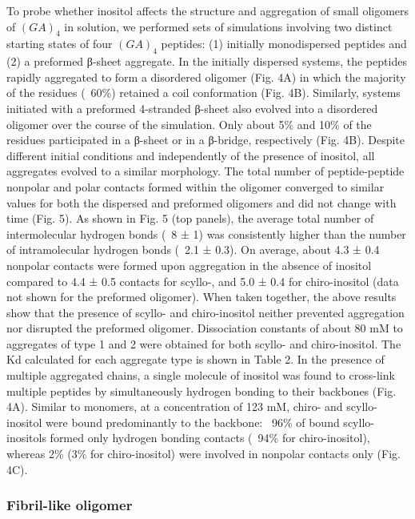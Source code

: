 	To probe whether inositol affects the structure and aggregation of small oligomers of $(GA)_4$ in solution, we performed sets of simulations involving two distinct starting states of four $(GA)_4$ peptides: (1) initially monodispersed peptides and (2) a preformed β-sheet aggregate. In the initially dispersed systems, the peptides rapidly aggregated to form a disordered oligomer (Fig. 4A) in which the majority of the residues (~60\%) retained a coil conformation (Fig. 4B). Similarly, systems initiated with a preformed 4-stranded β-sheet also evolved into a disordered oligomer over the course of the simulation. Only about 5\% and 10\% of the residues participated in a β-sheet or in a β-bridge, respectively (Fig. 4B).
Despite different initial conditions and independently of the presence of inositol, all aggregates evolved to a similar morphology. The total number of peptide-peptide nonpolar and polar contacts formed within the oligomer converged to similar values for both the dispersed and preformed oligomers and did not change with time (Fig. 5). As shown in Fig. 5 (top panels), the average total number of intermolecular hydrogen bonds (~8 ± 1) was consistently higher than the number of intramolecular hydrogen bonds (~2.1 ± 0.3). On average, about 4.3 ± 0.4 nonpolar contacts were formed upon aggregation in the absence of inositol compared to 4.4 ± 0.5 contacts for scyllo-, and 5.0 ± 0.4 for chiro-inositol (data not shown for the preformed oligomer). When taken together, the above results show that the presence of scyllo- and chiro-inositol neither prevented aggregation nor disrupted the preformed oligomer.
	 Dissociation constants of about 80 mM to aggregates of type 1 and 2 were obtained for both scyllo- and chiro-inositol. The Kd calculated for each aggregate type is shown in Table 2. In the presence of multiple aggregated chains, a single molecule of inositol was found to cross-link multiple peptides by simultaneously hydrogen bonding to their backbones (Fig. 4A). Similar to monomers, at a concentration of 123 mM, chiro- and scyllo-inositol were bound predominantly to the backbone: ~96\% of bound scyllo-inositols formed only hydrogen bonding contacts (~94\% for chiro-inositol), whereas 2\% (3\% for chiro-inositol) were involved in nonpolar contacts only (Fig. 4C).

\subsubsection{Fibril-like oligomer} %

